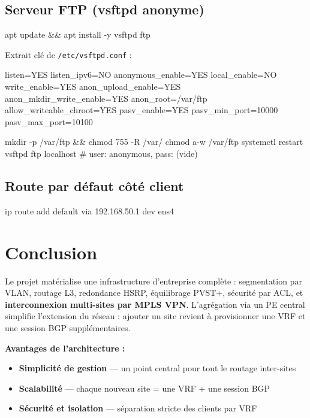 \documentclass[11pt,a4paper]{article}
\begin{document}
\subsection{Serveur FTP (vsftpd anonyme)}

\begin{ciscobox}[listing options={style=cisco,language=bash}]
apt update && apt install -y vsftpd ftp
\end{ciscobox}

Extrait clé de \texttt{/etc/vsftpd.conf} :
\begin{ciscobox}[listing options={style=cisco,language=bash}]
listen=YES
listen_ipv6=NO
anonymous_enable=YES
local_enable=NO
write_enable=YES
anon_upload_enable=YES
anon_mkdir_write_enable=YES
anon_root=/var/ftp
allow_writeable_chroot=YES
pasv_enable=YES
pasv_min_port=10000
pasv_max_port=10100
\end{ciscobox}

\begin{ciscobox}[listing options={style=cisco,language=bash}]
mkdir -p /var/ftp && chmod 755 -R /var/
chmod a-w /var/ftp
systemctl restart vsftpd
ftp localhost   # user: anonymous, pass: (vide)
\end{ciscobox}

\subsection{Route par défaut côté client}

\begin{ciscobox}[listing options={style=cisco,language=bash}]
ip route add default via 192.168.50.1 dev ens4
\end{ciscobox}

\section{Conclusion}

Le projet matérialise une infrastructure d'entreprise complète : segmentation par VLAN, routage L3, redondance HSRP, équilibrage PVST+, sécurité par ACL, et \textbf{interconnexion multi-sites par MPLS VPN}. L'agrégation via un PE central simplifie l'extension du réseau : ajouter un site revient à provisionner une VRF et une session BGP supplémentaires.

\medskip
\textbf{Avantages de l'architecture :}
\begin{itemize}
  \item \textbf{Simplicité de gestion} — un point central pour tout le routage inter-sites
  \item \textbf{Scalabilité} — chaque nouveau site = une VRF + une session BGP
  \item \textbf{Sécurité et isolation} — séparation stricte des clients par VRF
\end{itemize}
\end{document}

